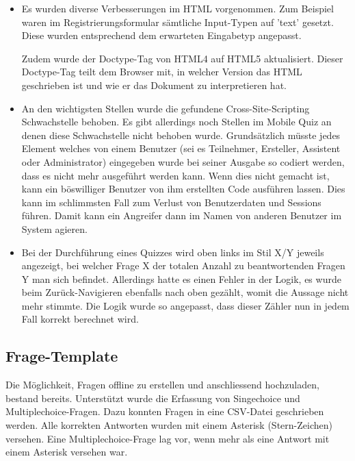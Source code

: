 \begin{itemize}
	\item Es wurden diverse Verbesserungen im HTML vorgenommen. Zum Beispiel waren im Registrierungsformular sämtliche Input-Typen auf 'text' gesetzt. Diese wurden entsprechend dem erwarteten Eingabetyp angepasst.
	
	Zudem wurde der Doctype-Tag von HTML4 auf HTML5 aktualisiert. Dieser Doctype-Tag teilt dem Browser mit, in welcher Version das HTML geschrieben ist und wie er das Dokument zu interpretieren hat.
	
	\item An den wichtigsten Stellen wurde die gefundene \gls{Cross-Site-Scripting} Schwachstelle behoben. Es gibt allerdings noch Stellen im Mobile Quiz an denen diese Schwachstelle nicht behoben wurde. Grundsätzlich müsste jedes Element welches von einem Benutzer (sei es Teilnehmer, Ersteller, Assistent oder Administrator) eingegeben wurde bei seiner Ausgabe so codiert werden, dass es nicht mehr ausgeführt werden kann. Wenn dies nicht gemacht ist, kann ein böswilliger Benutzer von ihm erstellten Code ausführen lassen. Dies kann im schlimmsten Fall zum Verlust von Benutzerdaten und Sessions führen. Damit kann ein Angreifer dann im Namen von anderen Benutzer im System agieren.
	
	\item Bei der Durchführung eines Quizzes wird oben links im Stil X/Y jeweils angezeigt, bei welcher Frage X der totalen Anzahl zu beantwortenden Fragen Y man sich befindet. Allerdings hatte es einen Fehler in der Logik, es wurde beim Zurück-Navigieren ebenfalls nach oben gezählt, womit die Aussage nicht mehr stimmte.
	Die Logik wurde so angepasst, dass dieser Zähler nun in jedem Fall korrekt berechnet wird. 
	
\end{itemize}


\subsection{Frage-Template}

\label{subsec:FrageTemplate}
Die Möglichkeit, Fragen offline zu erstellen und anschliessend hochzuladen, bestand bereits. Unterstützt wurde die Erfassung von Singechoice und Multiplechoice-Fragen. Dazu konnten Fragen in eine \gls{CSV}-Datei geschrieben werden. Alle korrekten Antworten wurden mit einem Asterisk (Stern-Zeichen) versehen. Eine Multiplechoice-Frage lag vor, wenn mehr als eine Antwort mit einem Asterisk versehen war.

